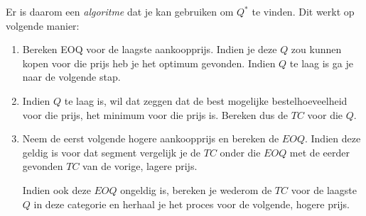 Er is daarom een \textit{algoritme} dat je kan gebruiken om $Q^*$ te vinden. Dit werkt op volgende manier:
\begin{enumerate}
    \item Bereken EOQ voor de laagste aankoopprijs. Indien je deze $Q$ zou kunnen kopen voor die prijs heb je het optimum gevonden. Indien $Q$ te laag is ga je naar de volgende stap.
    \item Indien $Q$ te laag is, wil dat zeggen dat de best mogelijke bestelhoeveelheid voor die prijs, het minimum voor die prijs is. Bereken dus de $TC$ voor die $Q$.
    \item Neem de eerst volgende hogere aankoopprijs en bereken de $EOQ$. Indien deze geldig is voor dat segment vergelijk je de $TC$ onder die $EOQ$ met de eerder gevonden $TC$ van de vorige, lagere prijs.

    Indien ook deze $EOQ$ ongeldig is, bereken je wederom de $TC$ voor de laagste $Q$ in deze categorie en herhaal je het proces voor de volgende, hogere prijs.
\end{enumerate}
